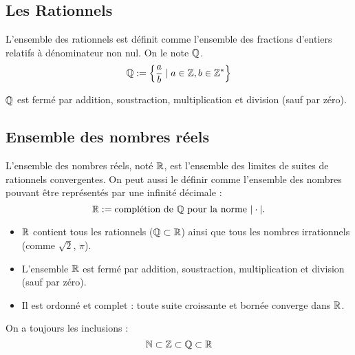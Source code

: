 \subsection{Les Rationnels}

\begin{definition}
    L'ensemble des rationnels est définit comme l'ensemble des fractions d'entiers relatifs à dénominateur non nul. 
    On le note $\mathbb{Q}$. 
        \[ \mathbb{Q} := \left\{ \frac{a}{b} \; | \; a \in \mathbb{Z}, b \in \mathbb{Z}^* \right\} \] 
\end{definition}

\begin{proposition}
    $\mathbb{Q}$ est fermé par addition, soustraction, multiplication et division (sauf par zéro). 
\end{proposition}

\subsection{Ensemble des nombres réels}

\begin{definition}
    L'ensemble des nombres réels, noté $\mathbb{R}$, est l'ensemble des limites de suites de rationnels convergentes. 
    On peut aussi le définir comme l'ensemble des nombres pouvant être représentés par une infinité décimale :
    \[
        \mathbb{R} := \text{complétion de } \mathbb{Q} \text{ pour la norme } | \cdot |.
    \]
\end{definition}

\begin{remark}
    \begin{itemize}
        \item $\mathbb{R}$ contient tous les rationnels (\(\mathbb{Q} \subset \mathbb{R}\)) ainsi que tous les nombres irrationnels (comme $\sqrt{2}$, $\pi$).
        \item L'ensemble $\mathbb{R}$ est fermé par addition, soustraction, multiplication et division (sauf par zéro).
        \item Il est ordonné et complet : toute suite croissante et bornée converge dans $\mathbb{R}$.
    \end{itemize}
\end{remark}

\begin{prop}[Inclusions]
    On a toujours les inclusions : 
    \[
        \mathbb{N} \subset \mathbb{Z} \subset \mathbb{Q} \subset \mathbb{R}
    \]
\end{prop}



